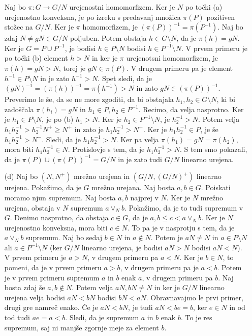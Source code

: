 \documentclass[a4paper, 12pt]{article}
\begin{document}
\begin{enumerate}
Naj bo $\pi : G\rightarrow G/N$ urejenostni homomorfizem. Ker je $N$ po točki (a) urejenostno konveksna, je po izreku s predavanj množica $\pi(P)$ pozitiven stožec na $G/N$. Ker je $\pi$ homomorfizem, je $(\pi(P))^{-1} = \pi (P^{-1})$. Naj bo zdaj $N\neq gN \in G/N$ poljuben. Potem obstaja $h \in G\setminus N$, da je $\pi(h) = gN$. Ker je $G= P\cup P^{-1}$, je bodisi $h\in P\setminus N$ bodisi $h\in P^{-1} \setminus N$. V prvem primeru je po točki (b) element $h> N$ in ker je $\pi$ urejenotsni homomorfizem, je $\pi(h) = gN > N$, torej je $gN \in \pi(P)$. V drugem primeru pa je element $h^{-1} \in P\setminus N$ in je zato $h^{-1}> N$. Spet sledi, da je $(gN)^{-1} = (\pi(h))^{-1} = \pi(h^{-1}) > N$ in zato $gN \in (\pi(P))^{-1}$. Preverimo le še, da se ne more zgoditi, da bi obstajala $h_1,h_2\in G\setminus N$, ki bi zadoščala $\pi(h_i) = gN$ in $h_1 \in P, h_2 \in P^{-1}$. Recimo, da velja nasprotno. Ker je $h_1 \in P\setminus N$, je po (b) $h_1 > N$. Ker je $h_2 \in P^{-1}\setminus N$, je $h_2^{-1} > N$. Potem velja $h_1 h_2^{-1} > h_2^{-1} N^+ \ge N^+$ in zato je $h_1 h_2^{-1}> N^+$. Ker je $h_1h_2^{-1}\in P$, je še $h_1 h_2^{-1} > N^-$. Sledi, da je $h_1 h_2^{-1}>N$. Ker pa velja $\pi(h_1) = gN = \pi(h_2)$, mora biti $h_1 h_2^{-1}\in N$. Protislovje s tem, da je $h_1h_2^{-1}>N$. S tem smo pokazali, da je $\pi(P) \cup (\pi(P))^{-1} = G/N$ in je zato tudi $G/N$ linearno urejena.

\item[(d)] Naj bo $(N,N^+)$ mrežno urejena in $(G/N, (G/N)^+)$ linearno urejena. Pokažimo, da je $G$ mrežno urejana. Naj bosta $a,b\in G$. Poiskati moramo njun supremum. Naj bosta $a,b$ najprej v $N$. Ker je $N$ mrežno urejena, obstaja v $N$ supremum $a\lor_N b$. Pokažimo, da je to tudi supremum v $G$. Denimo nasprotno, da obstaja $c\in G$, da je $a,b \le c < a\lor_N b$. Ker je $N$ urejenostno konveksna, mora biti $c\in N$. To pa je v nasprotju s tem, da je $a\lor_N b$ supremum. Naj bo sedaj $b\in N$ in $a\notin N$. Potem je $aN \neq N$ in $a\in P\setminus N$ ali $a\in P^{-1}\setminus N$ (ker $G/N$ linearno urejena, je bodisi $aN > N$ bodisi $aN < N$). V prvem primeru je $a>N$, v drugem primeru pa $a<N$. Ker je $b\in N$, to pomeni, da je v prvem primeru $a>b$, v drugem primeru pa je $a<b$. Potem je v prvem primeru supremum $a$ in $b$ enak $a$, v drugem primeru pa $b$. Naj bosta zdaj še $a,b\notin N$. Potem velja $aN,bN \neq N$ in ker je $G/N$ linearno urejena velja bodisi $aN < bN$ bodisi $bN < aN$. Obravnavajmo le prvi primer, drugi gre namreč enako. Če je $aN < bN$, je tudi $aN  <b e = b $, ker $e\in N$ in od tod tudi $ae = a <b$.  Sledi, da je supremum $a$ in $b$ enak $b$. To je res supremum, saj ni manjše zgornje meje za element $b$.


\end{enumerate}
\end{document}
